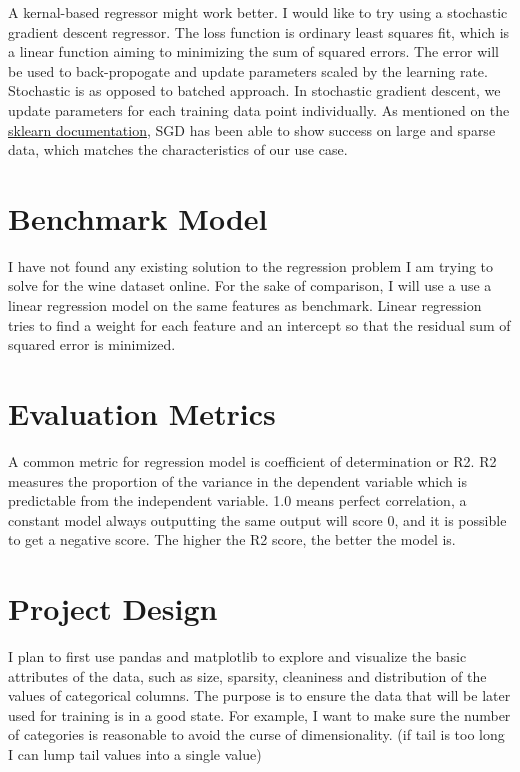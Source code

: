 \documentclass{article}
\begin{document}
A kernal-based regressor might work better. I would like to try using a stochastic gradient descent regressor. The loss function is ordinary least squares fit, which is a linear function aiming to minimizing the sum of squared errors. The error will be used to back-propogate and update parameters scaled by the learning rate. Stochastic is as opposed to batched approach. In stochastic gradient descent, we update parameters for each training data point individually. As mentioned on the \href{http://scikit-learn.org/stable/modules/sgd.html#regression}{sklearn documentation}, SGD has been able to show success on large and sparse data, which matches the characteristics of our use case.

\section{Benchmark Model}
I have not found any existing solution to the regression problem I am trying to solve for the wine dataset online. For the sake of comparison, I will use a use a linear regression model on the same features as benchmark. Linear regression tries to find a weight for each feature and an intercept so that the residual sum of squared error is minimized.

\section{Evaluation Metrics}
A common metric for regression model is coefficient of determination or R2. R2 measures the proportion of the variance in the dependent variable which is predictable from the independent variable. 1.0 means perfect correlation, a constant model always outputting the same output will score 0, and it is possible to get a negative score. The higher the R2 score, the better the model is.

\section{Project Design}
I plan to first use pandas and matplotlib to explore and visualize the basic attributes of the data, such as size, sparsity, cleaniness and distribution of the values of categorical columns. The purpose is to ensure the data that will be later used for training is in a good state. For example, I want to make sure the number of categories is reasonable to avoid the curse of dimensionality. (if tail is too long I can lump tail values into a single value)
\end{document}
